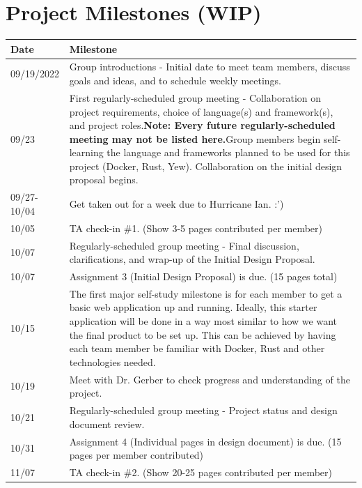 \documentclass[parskip=half, fontsize=12pt]{scrartcl}
\begin{document}
\section{Project Milestones (WIP)}
\begin{longtable}{| p{} | p{} |}
    \hline
    \textbf{Date} & \textbf{Milestone}\\\hline\hline
    09/19/2022 & Group introductions - Initial date to meet team members, discuss goals and ideas, and to schedule weekly meetings.\\\hline
    09/23 & First regularly-scheduled group meeting - Collaboration on project requirements, choice of language(s) and framework(s), and project roles.\newline \textbf{Note: Every future regularly-scheduled meeting may not be listed here.}\newline\newline Group members begin self-learning the language and frameworks planned to be used for this project (Docker, Rust, Yew). Collaboration on the initial design proposal begins.\\\hline
    09/27-10/04 & Get taken out for a week due to Hurricane Ian. :')\\\hline
    10/05 & TA check-in \#1. (Show 3-5 pages contributed per member)\\\hline
    10/07 & Regularly-scheduled group meeting - Final discussion, clarifications, and wrap-up of the Initial Design Proposal.\\\hline
    10/07 & Assignment 3 (Initial Design Proposal) is due. (15 pages total)\\\hline
    10/15 & The first major self-study milestone is for each member to get a basic web application up and running. Ideally, this starter application will be done in a way most similar to how we want the final product to be set up. This can be achieved by having each team member be familiar with Docker, Rust and other technologies needed.\\\hline
    10/19 & Meet with Dr. Gerber to check progress and understanding of the project.\\\hline
    10/21 & Regularly-scheduled group meeting - Project status and design document review.\\\hline
    10/31 & Assignment 4 (Individual pages in design document) is due. (15 pages per member contributed)\\\hline
    11/07 & TA check-in \#2. (Show 20-25 pages contributed per member)\\\hline

\end{longtable}
\end{document}
